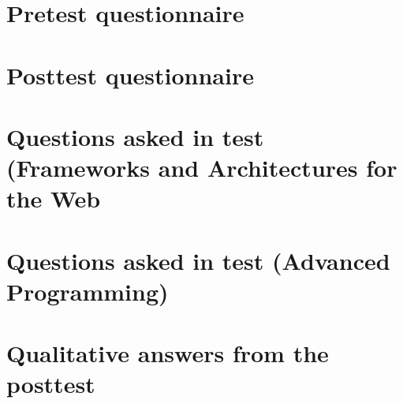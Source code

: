 \begin{appendices}


\section{Pretest questionnaire}\label{app:pretest}
 \clearpage


\section{Posttest questionnaire}\label{app:posttest}
 \clearpage


\section{Questions asked in test (Frameworks and Architectures for the Web}\label{app:questions}
 \clearpage

\section{Questions asked in test (Advanced Programming)}\label{app:questions-advanced}
 \clearpage



\section{Qualitative answers from the posttest}\label{app:qualitative-answers-posttest}
 \clearpage

\end{appendices}